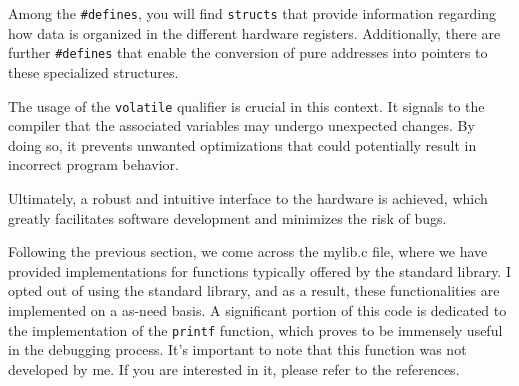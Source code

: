 \documentclass[12pt,a4paper]{article}
\begin{document}
Among the \texttt{\#defines}, you will find \texttt{structs} that provide
information regarding how data is organized in the different hardware registers.
Additionally, there are further \texttt{\#defines} that enable the conversion
of pure addresses into pointers to these specialized
structures.

The usage of the \texttt{volatile} qualifier is crucial in this context. It
signals to the compiler that the associated variables may undergo unexpected
changes. By doing so, it prevents unwanted optimizations that could potentially
result in incorrect program behavior.

Ultimately, a robust and intuitive interface to the hardware is achieved,
which greatly facilitates software development and minimizes the risk of bugs.

Following the previous section, we come across the mylib.c file, where we have
provided implementations for functions typically offered by the standard
library. I opted out of using the standard library, and as a result, these
functionalities are implemented on a as-need basis. A significant portion of
this code is dedicated to the implementation of the \texttt{printf} function,
which proves to be immensely useful in the debugging process. It's important
to note that this function was not developed by me. If you are interested in it,
please refer to the references.
\end{document}
